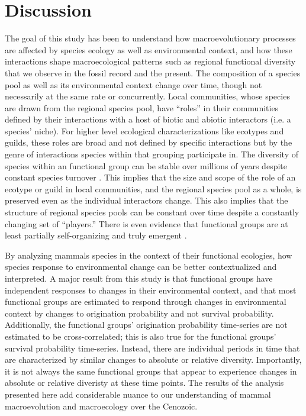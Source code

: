 \documentclass[12pt,letterpaper]{article}
\begin{document}
\section*{Discussion}

The goal of this study has been to understand how macroevolutionary processes are affected by species ecology as well as environmental context, and how these interactions shape macroecological patterns such as regional functional diversity that we observe in the fossil record and the present. The composition of a species pool as well as its environmental context change over time, though not necessarily at the same rate or concurrently. Local communities, whose species are drawn from the regional species pool, have ``roles'' in their communities defined by their interactions with a host of biotic and abiotic interactors (i.e. a species' niche). For higher level ecological characterizations like ecotypes and guilds, these roles are broad and not defined by specific interactions but by the genre of interactions species within that grouping participate in. The diversity of species within an functional group can be stable over millions of years despite constant species turnover \citep{Jernvall2004,Slater2015c,Valkenburgh1999}. This implies that the size and scope of the role of an ecotype or guild in local communities, and the regional species pool as a whole, is preserved even as the individual interactors change. This also implies that the structure of regional species pools can be constant over time despite a constantly changing set of ``players.'' There is even evidence that functional groups are at least partially self-organizing and truly emergent \citep{Scheffer2006a}.

By analyzing mammals species in the context of their functional ecologies, how species response to environmental change can be better contextualized and interpreted. A major result from this study is that functional groups have independent responses to changes in their environmental context, and that most functional groups are estimated to respond through changes in environmental context by changes to origination probability and not survival probability. Additionally, the functional groups' origination probability time-series are not estimated to be cross-correlated; this is also true for the functional groups' survival probability time-series. Instead, there are individual periods in time that are characterized by similar changes to absolute or relative diversity. Importantly, it is not always the same functional groups that appear to experience changes in absolute or relative diveristy at these time points. The results of the analysis presented here add considerable nuance to our understanding of mammal macroevolution and macroecology over the Cenozoic. 
\end{document}
